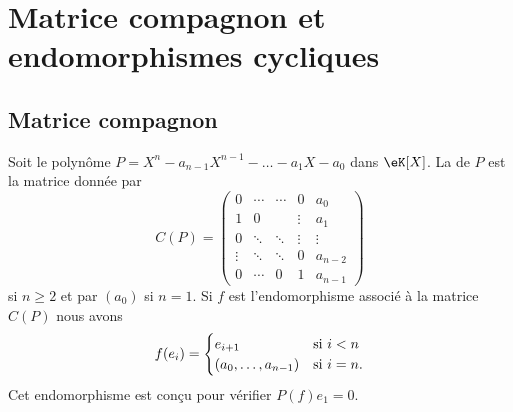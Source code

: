 
\section{Matrice compagnon et endomorphismes cycliques}

\subsection{Matrice compagnon}

Soit le polynôme \( P=X^n-a_{n-1}X^{n-1}-\ldots-a_1X-a_0\) dans \( \eK[X]\). La  de \( P\) est la matrice donnée par
\begin{equation}
    C(P)=\begin{pmatrix}
        0    &   \cdots    &   \cdots    &   0    &   a_0\\  
        1    &   0    &       &   \vdots    &   a_1\\  
        0    &   \ddots    &   \ddots    &   \vdots    &   \vdots\\  
        \vdots    &   \ddots    &   \ddots    &   0    &   a_{n-2}\\  
        0    &   \cdots    &   0    &   1    &   a_{n-1}    
    \end{pmatrix}
\end{equation}
si \( n\geq 2\) et par \( (a_0)\) si \( n=1\). Si \( f\) est l'endomorphisme associé à la matrice \( C(P)\) nous avons
\begin{equation}
    f(e_i)=\begin{cases}
        e_{i+1}    &   \text{si \( i<n\)}\\
        (a_0,\ldots, a_{n-1})    &    \text{si \( i=n\)}.
    \end{cases}
\end{equation}
Cet endomorphisme est conçu pour vérifier \( P(f)e_1=0\).


